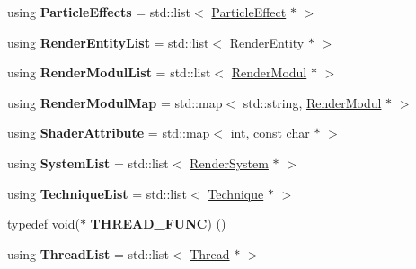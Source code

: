 \begin{DoxyCompactItemize}
\item 
\hypertarget{namespaceEngine_a409006f5d16c1db677f83883b5f4d96c}{}using {\bfseries Particle\+Effects} = std\+::list$<$ \hyperlink{classEngine_1_1ParticleEffect}{Particle\+Effect} $\ast$ $>$\label{namespaceEngine_a409006f5d16c1db677f83883b5f4d96c}

\item 
\hypertarget{namespaceEngine_aa1f146c0592cfc9672e77368df2669d4}{}using {\bfseries Render\+Entity\+List} = std\+::list$<$ \hyperlink{classEngine_1_1RenderEntity}{Render\+Entity} $\ast$ $>$\label{namespaceEngine_aa1f146c0592cfc9672e77368df2669d4}

\item 
\hypertarget{namespaceEngine_ac5ac856b830c487c96612df08dcb1c0c}{}using {\bfseries Render\+Modul\+List} = std\+::list$<$ \hyperlink{classEngine_1_1RenderModul}{Render\+Modul} $\ast$ $>$\label{namespaceEngine_ac5ac856b830c487c96612df08dcb1c0c}

\item 
\hypertarget{namespaceEngine_a56aa98498a4bf3ed51e0733e503a6c9a}{}using {\bfseries Render\+Modul\+Map} = std\+::map$<$ std\+::string, \hyperlink{classEngine_1_1RenderModul}{Render\+Modul} $\ast$ $>$\label{namespaceEngine_a56aa98498a4bf3ed51e0733e503a6c9a}

\item 
\hypertarget{namespaceEngine_afedc71af98792e954b08f84228dffccd}{}using {\bfseries Shader\+Attribute} = std\+::map$<$ int, const char $\ast$ $>$\label{namespaceEngine_afedc71af98792e954b08f84228dffccd}

\item 
\hypertarget{namespaceEngine_a2514c6f27d1cf54371c40afd0bccfd38}{}using {\bfseries System\+List} = std\+::list$<$ \hyperlink{classEngine_1_1RenderSystem}{Render\+System} $\ast$ $>$\label{namespaceEngine_a2514c6f27d1cf54371c40afd0bccfd38}

\item 
\hypertarget{namespaceEngine_a2d20fc51f21880a06f397458a79088ed}{}using {\bfseries Technique\+List} = std\+::list$<$ \hyperlink{classEngine_1_1Technique}{Technique} $\ast$ $>$\label{namespaceEngine_a2d20fc51f21880a06f397458a79088ed}

\item 
\hypertarget{namespaceEngine_aed1472a8590753d7c020d8b9e52d5fe3}{}typedef void($\ast$ {\bfseries T\+H\+R\+E\+A\+D\+\_\+\+F\+U\+N\+C}) ()\label{namespaceEngine_aed1472a8590753d7c020d8b9e52d5fe3}

\item 
\hypertarget{namespaceEngine_a7d17fe1eeada447c4150146ae5d24610}{}using {\bfseries Thread\+List} = std\+::list$<$ \hyperlink{classEngine_1_1Thread}{Thread} $\ast$ $>$\label{namespaceEngine_a7d17fe1eeada447c4150146ae5d24610}


\end{DoxyCompactItemize}
